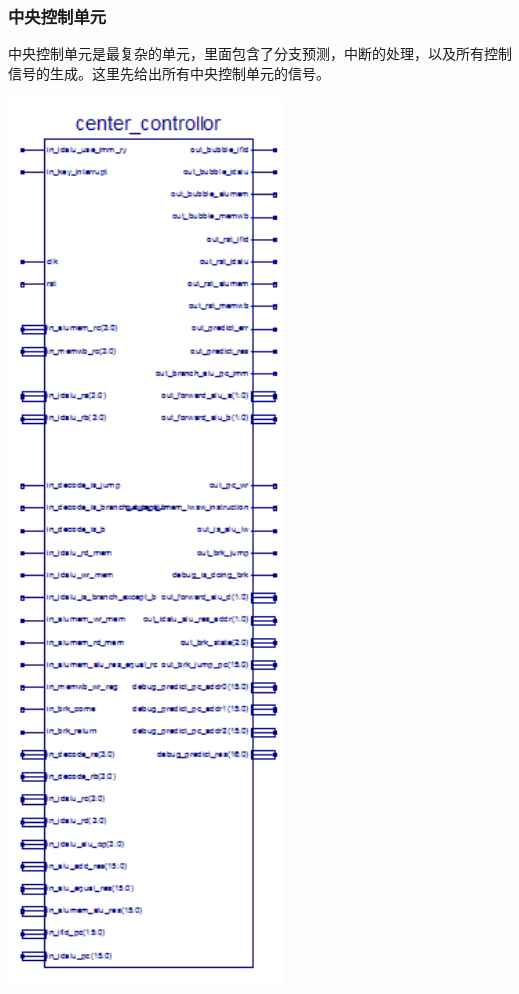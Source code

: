 \subsubsection{中央控制单元}
中央控制单元是最复杂的单元，里面包含了分支预测，中断的处理，以及所有控制信号的生成。这里先给出所有中央控制单元的信号。
\begin{center}
    \includegraphics[width=7.3cm]{image/detail/detail_center_controllor.png}
    \label{fig:center_controllor}
\end{center}
